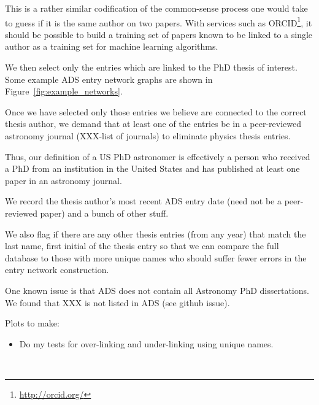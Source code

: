 \documentclass{emulateapj}
\begin{document}
This is a rather similar codification of the common-sense process one would take to guess if it is the same author on two papers. With services such as ORCID\footnote{\url{http://orcid.org/}}, it should be possible to build a training set of papers known to be linked to a single author as a training set for machine learning algorithms.  

We then select only the entries which are linked to the PhD thesis of interest.  Some example ADS entry network graphs are shown in Figure~\ref{fig:example_networks}.

Once we have selected only those entries we believe are connected to the correct thesis author, we demand that at least one of the entries be in a peer-reviewed astronomy journal (XXX-list of journals) to eliminate physics thesis entries.

Thus, our definition of a US PhD astronomer is effectively a person who received a PhD from an institution in the United States and has published at least one paper in an astronomy journal.

We record the thesis author's most recent ADS entry date (need not be a peer-reviewed paper)  and a bunch of other stuff.

We also flag if there are any other thesis entries (from any year) that match the last name, first initial of the thesis entry so that we can compare the full database to those with more unique names who should suffer fewer errors in the entry network construction.

One known issue is that ADS does not contain all Astronomy PhD dissertations. We found that XXX is not listed in ADS (see github issue).


Plots to make:
\begin{itemize}
\item{Do my tests for over-linking and under-linking using unique names.}
\end{itemize}


\begin{figure*}
  \\
        \caption{Examples of network graphs constructed to find papers linked to individual PhD thesis entries in ADS.   Top Left: Network of ADS entries with the same author as \citet{Yoachim07} (45 entries, 43 linked to the PhD), Top Right: Network for \citet{Bellm2011} (103 entries, 97 linked), Bottom Left: Network for \citet{Williams02}, (313 papers, 268 linked) Bottom Right: Network for \citet{Williams11} (157 papers, 111 linked).  Note, none of the linked papers for the two Williams PhDs overlap. \label{fig:example_networks}}
\end{figure*}
\end{document}
